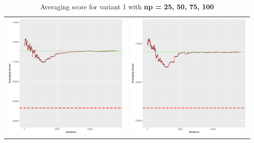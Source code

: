 \documentclass[]{scrartcl}
\begin{document}
\begin{table}[h!]
\begin{tabular}{cc}
\includegraphics[scale = 0.4]{./figs/win95pts/v1/75/avgBoundsEvolution-14252.pdf} & 
\includegraphics[scale = 0.4]{./figs/win95pts/v1/100/avgBoundsEvolution-14252.pdf} \\
\end{tabular}
\caption{Averaging score for variant 1 with \textbf{np =  25, 50, 75, 100}}
\end{table}
\end{document}
